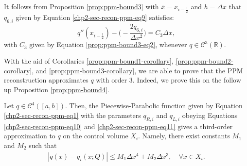 \begin{corollary}
	\label{prop:ppm-bound3-corollary}
	It follows from Proposition \ref{prop:ppm-bound3} with 
	$\overline{x} = x_{i-\frac{1}{2}}$ and $h = \Delta x$
	that $q_{6,i}$ given by Equation \eqref{chp2-sec-recon-ppm-eq9} satisfies:
	\begin{equation}
		\label{ppm-edges-bound3}
	q''(x_{i-\frac{1}{2}}) -\bigg(-\frac{2q_{6, i}}{\Delta x^2}\bigg) = C_3\Delta x,
	\end{equation}
	with $C_3$ given by Equation \eqref{prop:ppm-bound3-eq2}, whenever $q \in \mathcal{C}^3(\mathbb{R})$.
\end{corollary}
With the aid of Corollaries \ref{prop:ppm-bound1-corollary}, \ref{prop:ppm-bound2-corollary},
and  \ref{prop:ppm-bound3-corollary}, we are able to prove
that the PPM reconstruction approximates $q$ with order 3.
Indeed, we prove this on the follow up Proposition \ref{prop:ppm-bound4}.
\begin{prop}
	\label{prop:ppm-bound4}
	Let $q \in \mathcal{C}^{4}([a,b])$.
	Then, the Piecewise-Parabolic function given by
	Equation \eqref{chp2-sec-recon-ppm-eq1} with 
	the parameters $q_{R,i}$ and $q_{L,i}$ obeying Equations
	\eqref{chp2-sec-recon-ppm-eq10} and \eqref{chp2-sec-recon-ppm-eq11}
	gives a third-order approximation to $q$ on the control volume $X_i$.
	Namely, there exist constants $M_1$ and $M_2$ such that
	\begin{equation*}
		\begin{split}
			|q(x)-q_i(x;Q)| \leq  M_1 \Delta x ^4 + M_2 \Delta x ^3, \quad \forall x \in X_i.
		\end{split}
	\end{equation*}
\end{prop}
